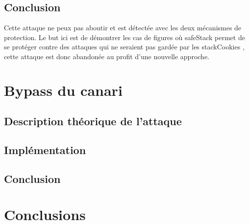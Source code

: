 \subsection{Conclusion}

Cette attaque ne peux pas aboutir et est détectée avec les deux mécanismes de protection. Le but ici est de démontrer les cas de figures où \og \gls{safeStack} \fg permet de se protéger contre des attaques qui ne seraient pas gardée par les \og \gls{stackCookies} \fg, cette attaque est donc abandonée au profit d'une nouvelle approche.


\section{Bypass du canari}

\subsection{Description théorique de l'attaque}
\subsection{Implémentation}
\subsection{Conclusion}


\section{Conclusions}
